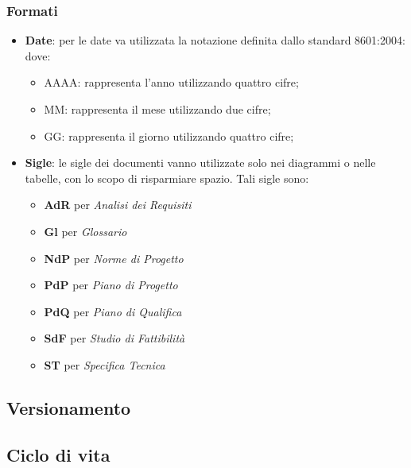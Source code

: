 		\subsubsection{Formati}
		\begin{itemize}
			\item \textbf{Date}: per le date va utilizzata la notazione definita dallo standard  8601:2004:
			dove:
			\begin{itemize}
				\item AAAA: rappresenta l'anno utilizzando quattro cifre;
				\item MM: rappresenta il mese utilizzando due cifre;
				\item GG: rappresenta il giorno utilizzando quattro cifre;
			\end{itemize}
			\item \textbf{Sigle}: le sigle dei documenti vanno utilizzate solo nei diagrammi o nelle tabelle, con lo scopo di risparmiare spazio. Tali sigle sono:
			\begin{itemize}
				\item \textbf{AdR} per \textit{Analisi dei Requisiti}
				\item \textbf{Gl} per \textit{Glossario}
				\item \textbf{NdP} per \textit{Norme di Progetto}
				\item \textbf{PdP} per \textit{Piano di Progetto}
				\item \textbf{PdQ} per \textit{Piano di Qualifica}
				\item \textbf{SdF} per \textit{Studio di Fattibilità}
				\item \textbf{ST} per \textit{Specifica Tecnica}
			\end{itemize}	
		\end{itemize}
	\subsection{Versionamento}
	\subsection{Ciclo di vita}
